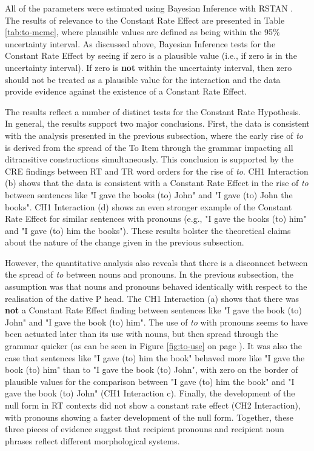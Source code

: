 	All of the parameters were estimated using Bayesian Inference with RSTAN \citep{stan.2016}. The results of relevance to the Constant Rate Effect are presented in Table \ref{tab:to-mcmc}, where plausible values are defined as being within the 95\% uncertainty interval. As discussed above, Bayesian Inference tests for the Constant Rate Effect by seeing if zero is a plausible value (i.e., if zero is in the uncertainty interval). If zero is \textbf{not} within the uncertainty interval, then zero should not be treated as a plausible value for the interaction and the data provide evidence against the existence of a Constant Rate Effect.



   The results reflect a number of distinct tests for the Constant Rate Hypothesis. In general, the results support two major conclusions. First, the data is consistent with the analysis presented in the previous subsection, where the early rise of \textit{to} is derived from the spread of the To Item through the grammar impacting all ditransitive constructions simultaneously. This conclusion is supported by the CRE findings between RT and TR word orders for the rise of \textit{to}. CH1 Interaction (b) shows that the data is consistent with a Constant Rate Effect in the rise of \textit{to} between sentences like "I gave the books (to) John" and "I gave (to) John the books". CH1 Interaction (d) shows an even stronger example of the Constant Rate Effect for similar sentences with pronouns (e.g., "I gave the books (to) him" and "I gave (to) him the books"). These results bolster the theoretical claims about the nature of the change given in the previous subsection.

   However, the quantitative analysis also reveals that there is a disconnect between the spread of \textit{to} between nouns and pronouns. In the previous subsection, the assumption was that nouns and pronouns behaved identically with respect to the realisation of the dative P head. The CH1 Interaction (a) shows that there was \textbf{not} a Constant Rate Effect finding between sentences like "I gave the book (to) John" and "I gave the book (to) him". The use of \textit{to} with pronouns seems to have been actuated later than its use with nouns, but then spread through the grammar quicker (as can be seen in Figure \ref{fig:to-use} on page \pageref{fig:to-use}). It was also the case that sentences like "I gave (to) him the book" behaved more like "I gave the book (to) him" than to "I gave the book (to) John", with zero on the border of plausible values for the comparison between "I gave (to) him the book" and "I gave the book (to) John" (CH1 Interaction c). Finally, the development of the null form in RT contexts did not show a constant rate effect (CH2 Interaction), with pronouns showing a faster development of the null form. Together, these three pieces of evidence suggest that recipient pronouns and recipient noun phrases reflect different morphological systems.


